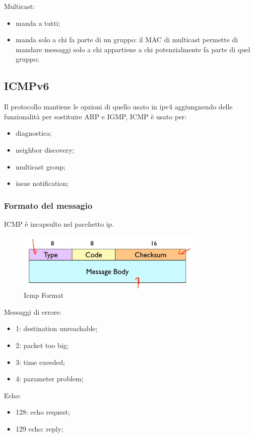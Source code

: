 \documentclass[12pt]{article}
\begin{document}
Multicast:
\begin{itemize}
    \item manda a tutti;
    \item manda solo a chi fa parte di un gruppo: il MAC di multicast permette di mandare messaggi solo a chi appartiene a chi potenzialmente fa parte di quel gruppo;
\end{itemize}


\subsection{ICMPv6}
Il protocollo mantiene le opzioni di quello usato in ipv4 aggiungnendo delle funzionalit\`a per sostituire ARP e IGMP, ICMP \`e usato per:
\begin{itemize}
    \item diagnostica;
    \item neighbor discovery;
    \item multicast group;
    \item issue notification;
\end{itemize}

\subsubsection{Formato del messagio}
ICMP \`e incapsulto nel pacchetto ip.
\begin{figure}[H]
    \centering
    \includegraphics[width=0.8\textwidth]{icmp-format.png}
    \caption{Icmp Format}
    \label{fig:icmp-format}
\end{figure}
Messaggi di errore:
\begin{itemize}
    \item 1: destination unreachable;
    \item 2: packet too big;
    \item 3: time exeeded;
    \item 4: parameter problem;
\end{itemize}
Echo:
\begin{itemize}
    \item 128: echo request;
    \item 129 echo: reply;
\end{itemize}
\end{document}

